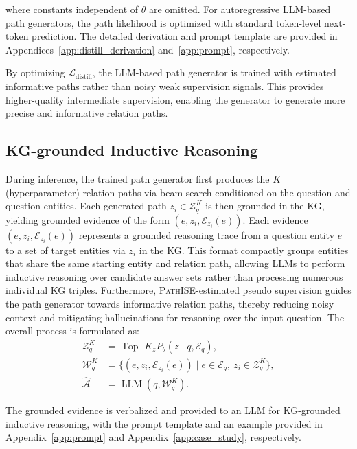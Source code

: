 \documentclass{article}
\newcommand{\framework}{\textsc{PathISE}\xspace}
\begin{document}
where constants independent of $\theta$ are omitted.
For autoregressive LLM-based path generators, the path likelihood is optimized with standard token-level next-token prediction. The detailed derivation and prompt template are provided in Appendices~\ref{app:distill_derivation} and~\ref{app:prompt}, respectively.

By optimizing $\mathcal{L}_{\mathrm{distill}}$, the LLM-based path generator is trained with estimated informative paths rather than noisy weak supervision signals.
This provides higher-quality intermediate supervision, enabling the generator to generate more precise and informative relation paths.

\subsection{KG-grounded Inductive Reasoning}


During inference, the trained path generator first produces the $K$ (hyperparameter) relation paths via beam search conditioned on the question and question entities.
Each generated path $z_i\in\mathcal{Z}_q^K$ is then grounded in the KG, yielding grounded evidence of the form $(e,z_i,\mathcal{E}_{z_i}(e))$.
Each evidence $(e,z_i,\mathcal{E}_{z_i}(e))$ represents a grounded reasoning trace from a question entity $e$ to a set of target entities via $z_i$ in the KG.
This format compactly groups entities that share the same starting entity and relation path, allowing LLMs to perform inductive reasoning over candidate answer sets rather than processing numerous individual KG triples. Furthermore, \framework{}-estimated pseudo supervision guides the path generator towards  informative relation paths, thereby reducing noisy context and mitigating hallucinations for reasoning over the input question.
The overall process is formulated as:
\begin{equation}
\begin{aligned}
\mathcal{Z}_q^K
&=
\operatorname{Top}\text{-}K_{z}
P_\theta(z\mid q,\mathcal{E}_q), \\
\mathcal{W}_q^K
&=
\{(e,z_i,\mathcal{E}_{z_i}(e))
\mid e\in\mathcal{E}_q,\ z_i\in\mathcal{Z}_q^K\}, \\
\hat{\mathcal{A}}
&=
\operatorname{LLM}(q,\mathcal{W}_q^K).
\end{aligned}
\end{equation}
 
The grounded evidence is verbalized and provided to an LLM for KG-grounded inductive reasoning, with the prompt template and an example provided in Appendix~\ref{app:prompt} and Appendix~\ref{app:case_study}, respectively.
\end{document}
